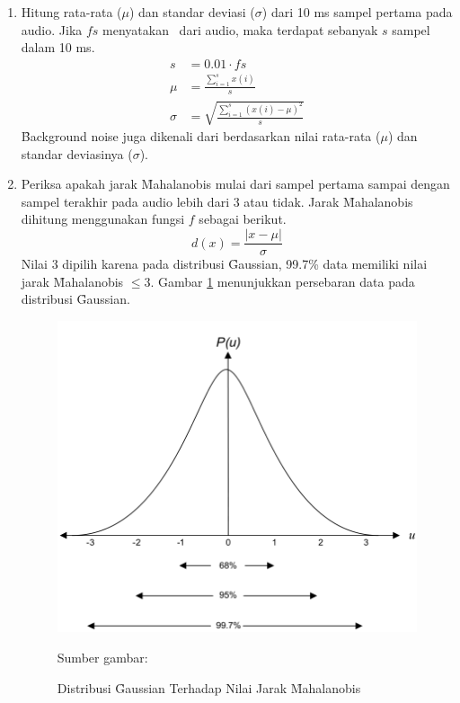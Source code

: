 \begin{enumerate}
	\item \label{satu} Hitung rata-rata ($\mu$) dan standar deviasi ($\sigma$) dari 10 ms sampel pertama pada audio. Jika $fs$ menyatakan \br~dari audio, maka terdapat sebanyak $s$ sampel dalam 10 ms.
	\begin{align}
    s &= 0.01\cdot fs \\
		\mu &= \frac{\sum_{i=1}^{s}x(i)}{s} \\
		\sigma &= \sqrt{\frac{\sum_{i=1}^{s}(x(i)-\mu)^2}{s}}
	\end{align}
	\f{Background noise} juga dikenali dari berdasarkan nilai rata-rata ($\mu$) dan standar deviasinya ($\sigma$).

	\item Periksa apakah jarak \f{Mahalanobis} mulai dari sampel pertama sampai dengan sampel terakhir pada audio lebih dari $3$ atau tidak. Jarak \f{Mahalanobis} dihitung menggunakan fungsi $f$ sebagai berikut.
	\begin{equation}
		d(x) = \frac{|x-\mu|}{\sigma}
	\end{equation}
	Nilai $3$ dipilih karena pada distribusi \f{Gaussian}, 99.7\% data memiliki nilai jarak \f{Mahalanobis} $\leq3$. Gambar \ref{fig:distribusinormal} menunjukkan persebaran data pada distribusi \f{Gaussian}.

	\begin{figure}
		\centering
		\includegraphics[width=0.85\linewidth]{pics/distribusi_normal}
		\caption{Distribusi \f{Gaussian} Terhadap Nilai Jarak \f{Mahalanobis}}{Sumber gambar: \cite{saha2005new}}
		\label{fig:distribusinormal}
	\end{figure}


\end{enumerate}
